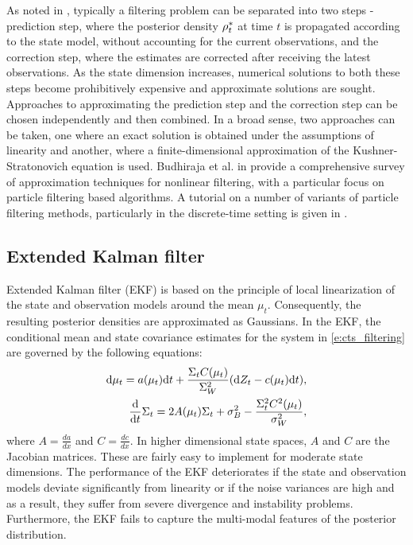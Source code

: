 As noted in , typically a filtering problem can be separated into two steps - prediction step, where the posterior density $\rho^*_t$ at time $t$ is propagated according to the state model, without accounting for the current observations, and the correction step, where the estimates are corrected after receiving the latest observations. As the state dimension increases, numerical solutions to both these steps become prohibitively expensive and approximate solutions are sought. Approaches to approximating the prediction step and the correction step can be chosen independently and then combined. In a broad sense, two approaches can be taken, one where an exact solution is obtained under the assumptions of linearity and another, where a finite-dimensional approximation of the Kushner-Stratonovich equation is used. Budhiraja et al. in \cite{budchelee07} provide a comprehensive survey of approximation techniques for nonlinear filtering, with a particular focus on particle filtering based algorithms. A tutorial on a number of variants of particle filtering methods, particularly in the discrete-time setting is given in \cite{arumasgorcla02}.
\subsection{Extended Kalman filter}
\label{s:ekf}
Extended Kalman filter (EKF) \cite{jaz70} is based on the principle of local linearization of the state and observation models around the mean $\mu_t$. Consequently, the resulting posterior densities are approximated as Gaussians. In the EKF, the conditional mean and state covariance estimates for the system in \eqref{e:cts_filtering} are governed by the following equations: 
\begin{align}
\ud \mu_t = a(\mu_t) \ud t + \frac{\Sigma_t C(\mu_t)}{\Sigma^2_W} (\ud Z_t - c(\mu_t) \ud t), \\
\frac{\ud}{\ud t} \Sigma_t = 2 A(\mu_t) \Sigma_t  + \sigma^2_B - \frac{\Sigma^2_t C^2(\mu_t)}{\sigma^2_W}, 
\label{e:ekf}
\end{align}
where $A = \frac{d a}{dx}$ and $C = \frac{d c}{dx}$. In higher dimensional state spaces, $A$ and $C$ are the Jacobian matrices. These are fairly easy to implement for moderate state dimensions. The performance of the EKF deteriorates if the state and observation models deviate significantly from linearity or if the noise variances are high and as a result, they suffer from severe divergence and instability problems. Furthermore, the EKF fails to capture the multi-modal features of the posterior distribution.
